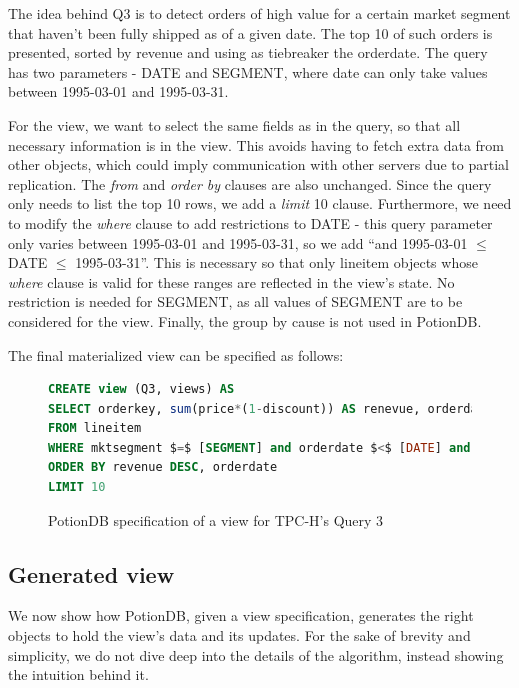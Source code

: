 \documentclass[sigconf, nonacm]{acmart}
\begin{document}
The idea behind Q3 is to detect orders of high value for a certain market segment that haven't been fully shipped as of a given date.
The top 10 of such orders is presented, sorted by revenue and using as tiebreaker the orderdate.
The query has two parameters - DATE and SEGMENT, where date can only take values between 1995-03-01 and 1995-03-31.

For the view, we want to select the same fields as in the query, so that all necessary information is in the view.
This avoids having to fetch extra data from other objects, which could imply communication with other servers due to partial replication.
The \emph{from} and \emph{order by} clauses are also unchanged. %
Since the query only needs to list the top 10 rows, we add a \emph{limit} 10 clause.
Furthermore, we need to modify the \emph{where} clause to add restrictions to DATE - this query parameter only varies between 1995-03-01 and 1995-03-31, so we add ``and 1995-03-01 $\leq$ DATE $\leq$ 1995-03-31''.
This is necessary so that only lineitem objects whose \emph{where} clause is valid for these ranges are reflected in the view's state.
No restriction is needed for SEGMENT, as all values of SEGMENT are to be considered for the view.
Finally, the group by cause is not used in PotionDB.

The final materialized view can be specified as follows:

\begin{figure}[h]
	\begin{lstlisting}[language=SQL]
CREATE view (Q3, views) AS
SELECT orderkey, sum(price*(1-discount)) AS renevue, orderdate, shippriority
FROM lineitem
WHERE mktsegment $=$ [SEGMENT] and orderdate $<$ [DATE] and shipdate $>$ [DATE] and 1995-03-01 $\leq$ DATE $\leq$ 1995-03-31
ORDER BY revenue DESC, orderdate
LIMIT 10
	\end{lstlisting}
\caption{PotionDB specification of a view for TPC-H's Query 3}
\label{fig:q3_view}
\end{figure}

\subsection{Generated view}
\label{subsec:generated_view}

We now show how PotionDB, given a view specification, generates the right objects to hold the view's data and its updates.
For the sake of brevity and simplicity, we do not dive deep into the details of the algorithm, instead showing the intuition behind it.
\end{document}
